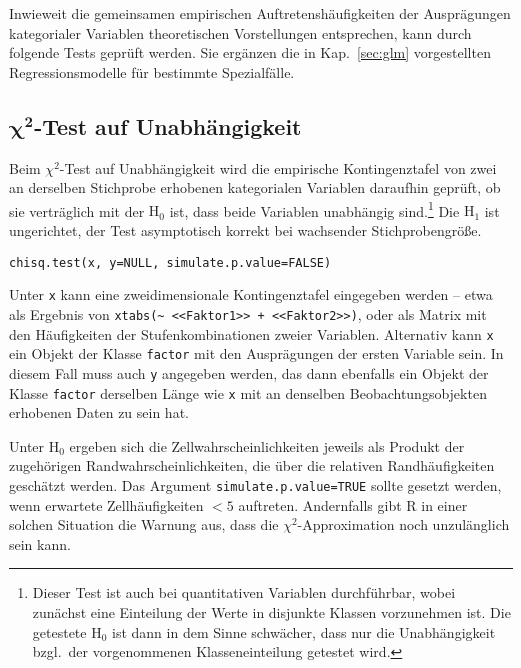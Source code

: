 Inwieweit die gemeinsamen empirischen Auftretenshäufigkeiten der Ausprägungen kategorialer Variablen theoretischen Vorstellungen entsprechen, kann durch folgende Tests geprüft werden. Sie ergänzen die in Kap.\ \ref{sec:glm} vorgestellten Regressionsmodelle für bestimmte Spezialfälle.

\subsection[\texorpdfstring{$\chi^{2}$}{chi2}-Test auf Unabhängigkeit]{$\bm{\chi^{2}}$-Test auf Unabhängigkeit}
\label{sec:chisqInd}

Beim $\chi^{2}$-Test auf Unabhängigkeit wird die empirische Kontingenztafel von zwei an derselben Stichprobe erhobenen kategorialen Variablen daraufhin geprüft, ob sie verträglich mit der $\text{H}_{0}$ ist, dass beide Variablen unabhängig sind.\footnote{Dieser Test ist auch bei quantitativen Variablen durchführbar, wobei zunächst eine Einteilung der Werte in disjunkte Klassen vorzunehmen ist. Die getestete $\text{H}_{0}$ ist dann in dem Sinne schwächer, dass nur die Unabhängigkeit bzgl.\ der vorgenommenen Klasseneinteilung getestet wird.} Die $\text{H}_{1}$ ist ungerichtet, der Test asymptotisch korrekt bei wachsender Stichprobengröße.
\begin{lstlisting}
chisq.test(x, y=NULL, simulate.p.value=FALSE)
\end{lstlisting}

Unter \lstinline!x! kann eine zweidimensionale Kontingenztafel eingegeben werden -- etwa als Ergebnis von \lstinline!xtabs(~ <<Faktor1>> + <<Faktor2>>)!, oder als Matrix mit den Häufigkeiten der Stufenkombinationen zweier Variablen. Alternativ kann \lstinline!x! ein Objekt der Klasse \lstinline!factor! mit den Ausprägungen der ersten Variable sein. In diesem Fall muss auch \lstinline!y! angegeben werden, das dann ebenfalls ein Objekt der Klasse \lstinline!factor! derselben Länge wie \lstinline!x! mit an denselben Beobachtungsobjekten erhobenen Daten zu sein hat.

Unter $\text{H}_{0}$ ergeben sich die Zellwahrscheinlichkeiten jeweils als Produkt der zugehörigen Randwahrscheinlichkeiten, die über die relativen Randhäufigkeiten geschätzt werden. Das Argument \lstinline!simulate.p.value=TRUE! sollte gesetzt werden, wenn erwartete Zellhäufigkeiten $< 5$ auftreten. Andernfalls gibt R in einer solchen Situation die Warnung aus, dass die $\chi^{2}$-Approximation noch unzulänglich sein kann.


